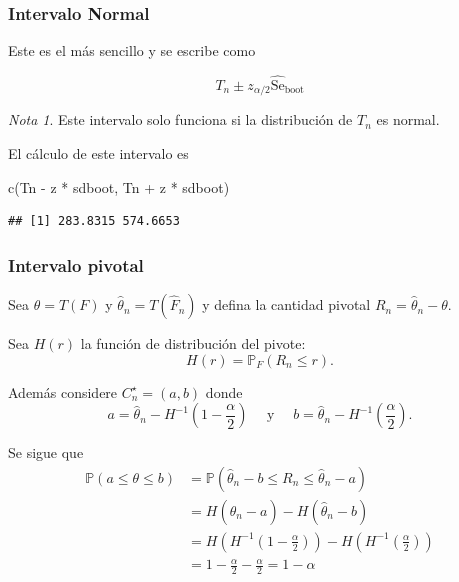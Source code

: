 \documentclass[
  12pt,
]{book}
\newenvironment{Shaded}{\begin{snugshade}}{\end{snugshade}}
\newcommand{\FunctionTok}[1]{\textcolor[rgb]{0.00,0.00,0.00}{#1}}
\newcommand{\NormalTok}[1]{#1}
\newcommand{\SpecialCharTok}[1]{\textcolor[rgb]{0.00,0.00,0.00}{#1}}
\theoremstyle{definition}
\theoremstyle{definition}
\theoremstyle{definition}
\theoremstyle{definition}
\theoremstyle{remark}
\newtheorem*{remark}{Nota}
\begin{document}
\hypertarget{intervalo-normal}{%
\subsubsection{Intervalo Normal}\label{intervalo-normal}}

Este es el más sencillo y se escribe como

\begin{equation}
T_{n} \pm z_{\alpha / 2} \widehat{\mathrm{Se}}_{\mathrm{boot}}
\end{equation}

\begin{remark}
Este intervalo solo funciona si la distribución de \(T_{n}\) es normal.
\end{remark}

El cálculo de este intervalo es

\begin{Shaded}
\begin{Highlighting}[]
\FunctionTok{c}\NormalTok{(Tn }\SpecialCharTok{{-}}\NormalTok{ z }\SpecialCharTok{*}\NormalTok{ sdboot, Tn }\SpecialCharTok{+}\NormalTok{ z }\SpecialCharTok{*}\NormalTok{ sdboot)}
\end{Highlighting}
\end{Shaded}

\begin{verbatim}
## [1] 283.8315 574.6653
\end{verbatim}

\hypertarget{intervalo-pivotal}{%
\subsubsection{Intervalo pivotal}\label{intervalo-pivotal}}

Sea \(\theta=T(F)\) y \(\widehat{\theta}_{n}=T\left(\widehat{F}_{n}\right)\) y defina la cantidad pivotal \(R_{n}=\widehat{\theta}_{n}-\theta .\)

Sea \(H(r)\) la función de distribución del pivote:
\[
H(r)=\mathbb{P}_{F}\left(R_{n} \leq r\right).
\]

Además considere \(C_{n}^{\star}=(a, b)\) donde
\[
a=\widehat{\theta}_{n}-H^{-1}\left(1-\frac{\alpha}{2}\right) \quad \text { y } \quad b=\widehat{\theta}_{n}-H^{-1}\left(\frac{\alpha}{2}\right).
\]

Se sigue que
\begin{align*}
\mathbb{P}(a \leq \theta \leq b)
&=\mathbb{P}\left(\widehat{\theta}_{n}-b \leq R_{n} \leq \widehat{\theta}_{n}-a\right) \\
&=H\left(\widehat{\theta}_{n}-a\right)-H\left(\widehat{\theta}_{n}-b\right) \\
&=H\left(H^{-1}\left(1-\frac{\alpha}{2}\right)\right)-H\left(H^{-1}\left(\frac{\alpha}{2}\right)\right) \\
&=1-\frac{\alpha}{2}-\frac{\alpha}{2}=1-\alpha
\end{align*}
\end{document}
